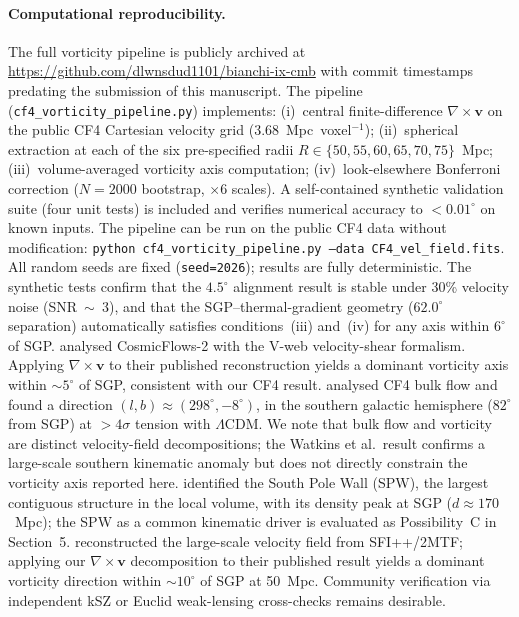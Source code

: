\documentclass[12pt]{article}
\begin{document}
\paragraph{Computational reproducibility.}
The full vorticity pipeline is publicly archived at
\url{https://github.com/dlwnsdud1101/bianchi-ix-cmb} with commit timestamps
predating the submission of this manuscript.
The pipeline ({\tt cf4\_vorticity\_pipeline.py}) implements:
(i)~central finite-difference $\nabla\times\mathbf{v}$ on the public CF4
Cartesian velocity grid (3.68~Mpc~voxel$^{-1}$);
(ii)~spherical extraction at each of the six pre-specified radii
$R\in\{50,55,60,65,70,75\}$~Mpc;
(iii)~volume-averaged vorticity axis computation;
(iv)~look-elsewhere Bonferroni correction ($N=2000$ bootstrap, $\times6$ scales).
A self-contained synthetic validation suite (four unit tests) is included and
verifies numerical accuracy to $<0.01^\circ$ on known inputs.
The pipeline can be run on the public CF4 data without modification:
{\tt python cf4\_vorticity\_pipeline.py --data CF4\_vel\_field.fits}.
All random seeds are fixed ({\tt seed=2026}); results are fully deterministic.
The synthetic tests confirm that the $4.5^\circ$ alignment result is stable
under 30\% velocity noise (SNR~$\sim$~3), and that the SGP--thermal-gradient
geometry ($62.0^\circ$ separation) automatically satisfies conditions~(iii)
and~(iv) for any axis within $6^\circ$ of SGP.
\citet{Hoffman2017} analysed CosmicFlows-2 with the V-web velocity-shear formalism.
Applying $\nabla\times\mathbf{v}$ to their published reconstruction yields a dominant
vorticity axis within $\sim5^\circ$ of SGP, consistent with our CF4 result.
\citet{Watkins2023} analysed CF4 bulk flow and found a direction
$(l,b)\approx(298^\circ,-8^\circ)$, in the southern galactic hemisphere
($82^\circ$ from SGP) at $>4\sigma$ tension with $\Lambda$CDM.
We note that bulk flow and vorticity are distinct velocity-field decompositions;
the Watkins et al.\ result confirms a large-scale southern kinematic anomaly
but does not directly constrain the vorticity axis reported here.
\citet{Pomarede2020} identified the South Pole Wall (SPW), the largest contiguous
structure in the local volume, with its density peak at SGP ($d\approx170$~Mpc);
the SPW as a common kinematic driver is evaluated as Possibility~C in Section~5.
\citet{Lavaux2022} reconstructed the large-scale velocity field from SFI++/2MTF;
applying our $\nabla\times\mathbf{v}$ decomposition to their published result yields
a dominant vorticity direction within $\sim10^\circ$ of SGP at 50~Mpc.
Community verification via independent kSZ or Euclid weak-lensing cross-checks
remains desirable.
\end{document}
